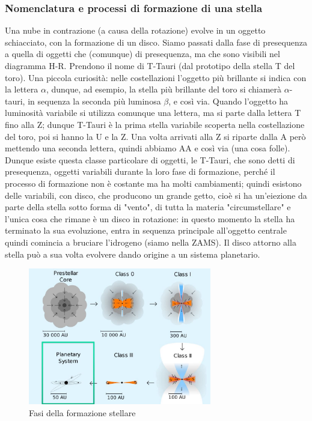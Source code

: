 \documentclass[a4paper,11pt]{article}
\begin{document}
    \subsubsection{Nomenclatura e processi di formazione di una stella}
        Una nube in contrazione (a causa della rotazione) evolve in un oggetto schiacciato, con la formazione di un disco. Siamo passati dalla fase di presequenza a quella di oggetti che (comunque) di presequenza, ma che sono visibili nel diagramma H-R. Prendono il nome di T-Tauri (dal prototipo della stella T del toro). Una piccola curiosità: nelle costellazioni l'oggetto più brillante si indica con la lettera $\alpha$, dunque, ad esempio, la stella più brillante del toro si chiamerà $\alpha$-tauri, in sequenza la seconda più luminosa $\beta$, e così via. Quando l'oggetto ha luminosità variabile si utilizza comunque una lettera, ma si parte dalla lettera T fino alla Z; dunque T-Tauri è la prima stella variabile scoperta nella costellazione del toro, poi si hanno la U e la Z. Una volta arrivati alla Z si riparte dalla A però mettendo una seconda lettera, quindi abbiamo AA e così via (una cosa folle).
        Dunque esiste questa classe particolare di oggetti, le T-Tauri, che sono detti di presequenza, oggetti variabili durante la loro fase di formazione, perché il processo di formazione non è costante ma ha molti cambiamenti; quindi esistono delle variabili, con disco, che producono un grande getto, cioè si ha un'eiezione da parte della stella sotto forma di "vento", di tutta la materia "circumstellare" e l'unica cosa che rimane è un disco in rotazione: in questo momento la stella ha terminato la sua evoluzione, entra in sequenza principale all'oggetto centrale quindi comincia a bruciare l'idrogeno (siamo nella ZAMS).
        Il disco attorno alla stella può a sua volta evolvere dando origine a un sistema planetario.
        \\
        \begin{figure}[h!!]
            \centering
                \includegraphics[width=8cm]{2dic/Formazione_Stellare.jpg}
                \caption{Fasi della formazione stellare}
            \label{fig:FormStell}
        \end{figure}
        \\
\end{document}
